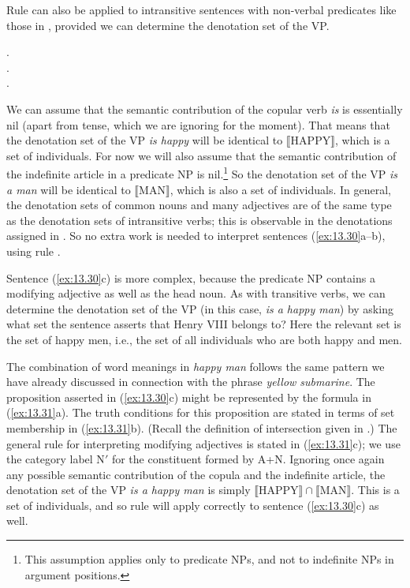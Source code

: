 Rule  can also be applied to intransitive sentences with non-verbal predicates like those in , provided we can determine the denotation set of the VP.


\ea \label{ex:13.30}
.\\
.\\
.
                       \z
\z


We can assume that the semantic contribution of the copular verb \textit{is} is essentially nil (apart from tense, which we are ignoring for the moment). That means that the denotation set of the VP \textit{is happy} will be identical to $\llbracket\text{HAPPY}\rrbracket$,  which is a set of individuals. For now we will also assume that the semantic contribution of the indefinite article in a predicate NP is nil.\footnote{This assumption applies only to predicate NPs, and not to indefinite NPs in argument positions.} So the denotation set of the VP \textit{is a man} will be identical to $\llbracket\text{MAN}\rrbracket$,  which is also a set of individuals. In general, the denotation sets of common nouns and many adjectives are of the same type as the denotation sets of intransitive verbs; this is observable in the denotations assigned in . So no extra work is needed to interpret sentences (\ref{ex:13.30}a--b), using rule .



Sentence (\ref{ex:13.30}c) is more complex, because the predicate NP contains a modifying adjective as well as the head noun. As with transitive verbs, we can determine the denotation set of the VP (in this case, \textit{is a happy man}) by asking what set the sentence asserts that Henry VIII belongs to? Here the relevant set is the set of happy men, i.e., the set of all individuals who are both happy and men.\largerpage



The combination of word meanings in \textit{happy man} follows the same pattern we have already discussed in connection with the phrase \textit{yellow submarine}. The proposition asserted in (\ref{ex:13.30}c) might be represented by the formula in (\ref{ex:13.31}a). The truth conditions for this proposition are stated in terms of set membership in (\ref{ex:13.31}b). (Recall the definition of intersection given in .) The general rule for interpreting modifying adjectives is stated in (\ref{ex:13.31}c); we use the category label N$'$ for the constituent formed by A+N. Ignoring once again any possible semantic contribution of the copula and the indefinite article, the denotation set of the VP \textit{is a happy man} is simply $\llbracket\text{HAPPY}\rrbracket \cap \llbracket\text{MAN}\rrbracket$. This is a set of individuals, and so rule  will apply correctly to sentence (\ref{ex:13.30}c) as well.\largerpage[-2]


